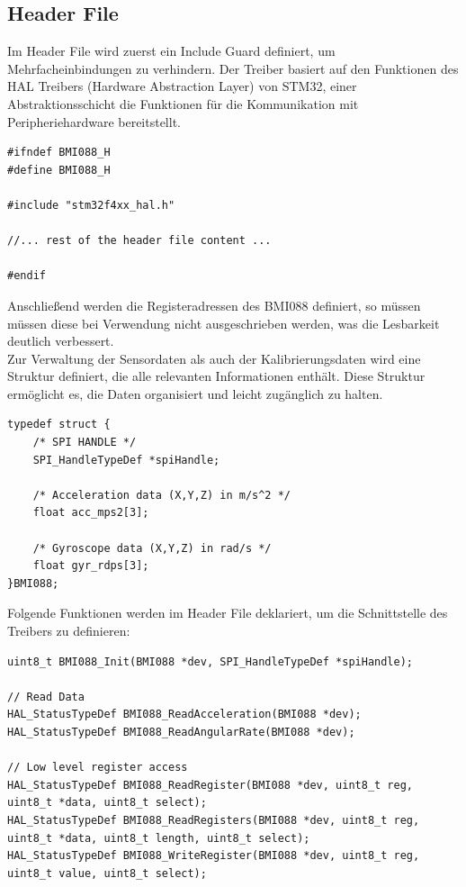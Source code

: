 \subsection{Header File}
Im Header File wird zuerst ein Include Guard definiert, um Mehrfacheinbindungen zu verhindern. Der Treiber basiert auf den Funktionen des HAL Treibers (Hardware Abstraction Layer) von STM32, einer Abstraktionsschicht die Funktionen für die Kommunikation mit Peripheriehardware bereitstellt. 
\begin{lstlisting}[style=cstyle, caption={Include Guard}, label={lst:C}]
#ifndef BMI088_H
#define BMI088_H

#include "stm32f4xx_hal.h"

//... rest of the header file content ...

#endif
\end{lstlisting}
Anschließend werden die Registeradressen des BMI088 definiert, so müssen müssen diese bei Verwendung nicht ausgeschrieben werden, was die Lesbarkeit deutlich verbessert.
\\
Zur Verwaltung der Sensordaten als auch der Kalibrierungsdaten wird eine Struktur definiert, die alle relevanten Informationen enthält. Diese Struktur ermöglicht es, die Daten organisiert und leicht zugänglich zu halten.
\begin{lstlisting}[style=cstyle, caption={Sensor Struktur}, 
label={lst:sensor_struct}]
typedef struct {
	/* SPI HANDLE */
	SPI_HandleTypeDef *spiHandle;

	/* Acceleration data (X,Y,Z) in m/s^2 */
	float acc_mps2[3];
	
	/* Gyroscope data (X,Y,Z) in rad/s */
	float gyr_rdps[3];
}BMI088;
\end{lstlisting}
Folgende Funktionen werden im Header File deklariert, um die Schnittstelle des Treibers zu definieren:
\begin{lstlisting}[style=cstyle, caption={Funktionendeklarationen}, label={lst:function_declarations}]
uint8_t BMI088_Init(BMI088 *dev, SPI_HandleTypeDef *spiHandle);

// Read Data
HAL_StatusTypeDef BMI088_ReadAcceleration(BMI088 *dev);
HAL_StatusTypeDef BMI088_ReadAngularRate(BMI088 *dev);

// Low level register access
HAL_StatusTypeDef BMI088_ReadRegister(BMI088 *dev, uint8_t reg, uint8_t *data, uint8_t select);
HAL_StatusTypeDef BMI088_ReadRegisters(BMI088 *dev, uint8_t reg, uint8_t *data, uint8_t length, uint8_t select);
HAL_StatusTypeDef BMI088_WriteRegister(BMI088 *dev, uint8_t reg, uint8_t value, uint8_t select);
\end{lstlisting}
